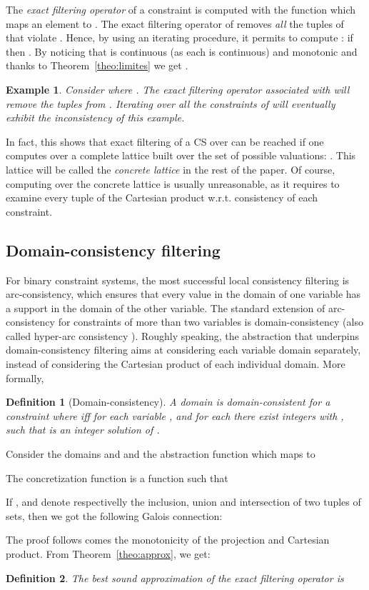 \documentclass[submission,copyright,creativecommons]{eptcs}
\newtheorem{definition}{Definition}
\newtheorem{example}{Example}
\begin{document}
\noindent
The {\it exact filtering operator} of a constraint  is computed with the function
 which maps an element  to 
.
The exact filtering operator of  removes {\it all} the tuples of  that violate .
Hence, by using an iterating procedure, it permits to compute :
if  then .
By noticing that  is continuous (as each  is continuous) and monotonic and thanks to Theorem~\ref{theo:limites} 
we get . 
\begin{example}
Consider  where . The exact
filtering operator associated with  will remove the tuples  from 
. Iterating over all the constraints of  will eventually exhibit the inconsistency of this example.
\end{example}
\noindent
In fact, this shows that exact filtering of a CS over  
can be reached if one computes over a complete lattice built over the set of possible valuations: 
. 
This lattice will be called the {\it concrete lattice} in the rest of the paper.
Of course, computing over the concrete lattice is usually unreasonable, as it requires to examine every tuple of the Cartesian product 
 w.r.t. consistency of each constraint.
 
\subsection{Domain-consistency filtering}

For binary constraint systems, the most successful local consistency filtering is arc-consistency, 
which ensures that every value in the domain of one variable has a support in the domain of the other variable.
The standard extension of arc-consistency for constraints of more than two variables is domain-consistency (also called
hyper-arc consistency \cite{MS98}).
Roughly speaking, the abstraction that underpins domain-consistency filtering aims at considering
each variable domain separately, instead of considering the Cartesian product of each individual domain. More
formally,
\begin{definition}[Domain-consistency]
A domain  is domain-consistent for a constraint  where  
iff for each variable ,  and for each 
there exist integers  with , 
such that  is an integer solution of .
\end{definition} 
\noindent
Consider the domains  and  
 and
the abstraction function  which maps  to


\noindent
The concretization function is a function  such that

\noindent
If ,  and   denote respectivelly the
inclusion, union and intersection of two tuples of sets, then we got the following Galois connection:
\begin{center}

\end{center}
\noindent
The proof follows comes the monotonicity of the projection and Cartesian product.
From Theorem~\ref{theo:approx}, we get:
\begin{definition}
The best sound approximation of the exact filtering operator  is 

\end{definition}
\end{document}
